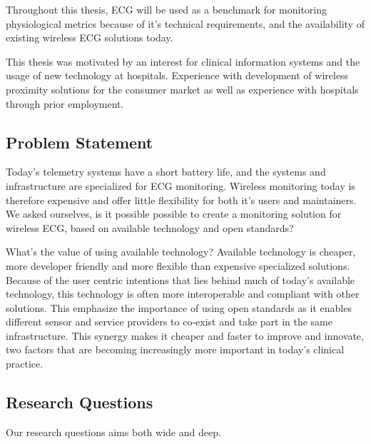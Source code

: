 Throughout this thesis, ECG will be used as a benchmark for monitoring physiological metrics because of it's technical requirements, and the availability of existing wireless ECG solutions today.


This thesis was motivated by an interest for clinical information systems and the usage of new technology at hospitals. Experience with development of wireless proximity solutions for the consumer market as well as experience with hospitals through prior employment.


\subsection{Problem Statement} 
\label{sub:problem_statement}

Today's telemetry systems have a short battery life, and the systems and infrastructure are specialized for ECG monitoring. Wireless monitoring today is therefore expensive and offer little flexibility for both it's users and maintainers. We asked ourselves, is it possible possible to create a monitoring solution for wireless ECG, based on available technology and open standards? 

What's the value of using available technology? Available technology is cheaper, more developer friendly and more flexible than expensive specialized solutions. Because of the user centric intentions that lies behind much of today's available technology, this technology is often more interoperable and compliant with other solutions. This emphasize the importance of using open standards as it enables different sensor and service providers to co-exist and take part in the same infrastructure. This synergy makes it cheaper and faster to improve and innovate, two factors that are becoming increasingly more important in today's clinical practice.

\subsection{Research Questions} 


Our research questions aims both wide and deep.

